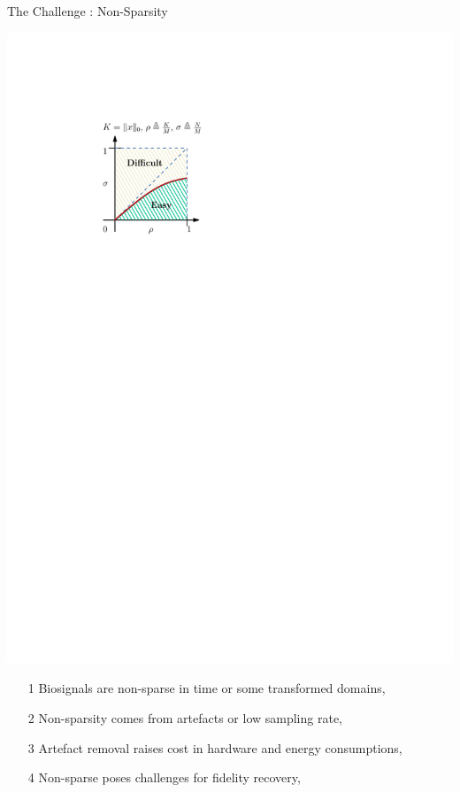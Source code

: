 \documentclass[notheorems,table]{beamer}
\begin{document}
\begin{frame}{The Challenge : Non-Sparsity}
    \begin{minipage}{.25\linewidth}
        \includegraphics[width=\linewidth]{phase_transition_illustrate.pdf}
    \end{minipage}
    \begin{minipage}{.74\linewidth}
        \begin{itemize}
            \item[1] Biosignals are non-sparse in time or some transformed domains,
            \item[2] Non-sparsity comes from artefacts or low sampling rate,
            \item[3] Artefact removal raises cost in hardware and energy consumptions,
            \item[4] Non-sparse poses challenges for fidelity recovery,
        \end{itemize}
    \end{minipage}
\end{frame}
\end{document}
